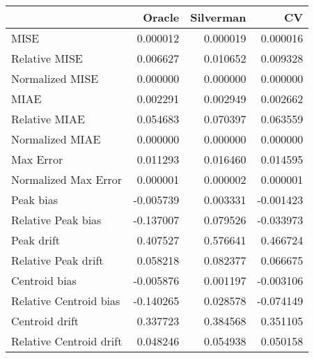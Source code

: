 \begin{tabular}{lrrr}
  \hline
 & Oracle & Silverman & CV \\ 
  \hline
MISE & 0.000012 & 0.000019 & 0.000016 \\ 
  Relative MISE & 0.006627 & 0.010652 & 0.009328 \\ 
  Normalized MISE & 0.000000 & 0.000000 & 0.000000 \\ 
  MIAE & 0.002291 & 0.002949 & 0.002662 \\ 
  Relative MIAE & 0.054683 & 0.070397 & 0.063559 \\ 
  Normalized MIAE & 0.000000 & 0.000000 & 0.000000 \\ 
  Max Error & 0.011293 & 0.016460 & 0.014595 \\ 
  Normalized Max Error & 0.000001 & 0.000002 & 0.000001 \\ 
  Peak bias & -0.005739 & 0.003331 & -0.001423 \\ 
  Relative Peak bias & -0.137007 & 0.079526 & -0.033973 \\ 
  Peak drift & 0.407527 & 0.576641 & 0.466724 \\ 
  Relative Peak drift & 0.058218 & 0.082377 & 0.066675 \\ 
  Centroid bias & -0.005876 & 0.001197 & -0.003106 \\ 
  Relative Centroid bias & -0.140265 & 0.028578 & -0.074149 \\ 
  Centroid drift & 0.337723 & 0.384568 & 0.351105 \\ 
  Relative Centroid drift & 0.048246 & 0.054938 & 0.050158 \\ 
   \hline
\end{tabular}
